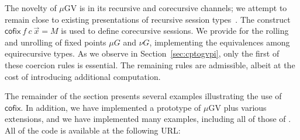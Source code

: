 \documentclass[orivec,envcountsame]{llncs}
\makeatletter
\newcommand{\lto}{\ensuremath{\multimap}}
\newcommand{\uto}{\ensuremath{\rightarrow}}
\newcommand{\mkwd}[1]{\mathsf{#1}}
\newcommand{\lrkwd}{\mkwd{cofix}}
\newcommand{\gvfix}[3]{\lrkwd\:#1\:#2 = #3}
\newcommand{\mucp}{$\mu\mathrm{CP}$\xspace}
\newcommand{\mugv}{$\mu\mathrm{GV}$\xspace}
\newcommand{\ba}{\begin{array}}
\newcommand{\ea}{\end{array}}
\newcommand{\bl}{\ba[t]{@{}l@{}}}
\newcommand{\el}{\ea}
\newcommand{\secref}[1]{Section~\ref{sec:#1}}
\makeatother
\begin{document}
The novelty of \mugv is in its recursive and corecursive channels; we attempt to remain close to
existing presentations of recursive session types~\citep{Honda98}.  The construct
$\gvfix{f}{c\:\vec{x}}{M}$ is used to define corecursive sessions.  We provide for the rolling and
unrolling of fixed points $\mu G$ and $\nu G$, implementing the equivalences among equirecursive
types. As we observe in \secref{cptogvpi}, only the first of these coercion rules is essential. The
remaining rules are admissible, albeit at the cost of introducing additional computation.



%



The remainder of the section presents several examples illustrating the use of $\lrkwd$. In
addition, we have implemented a prototype of \mugv plus various extensions, and we have implemented
many examples, including all of those of \citet{Toninho13}. All of the code is available at the
following URL:
\end{document}
